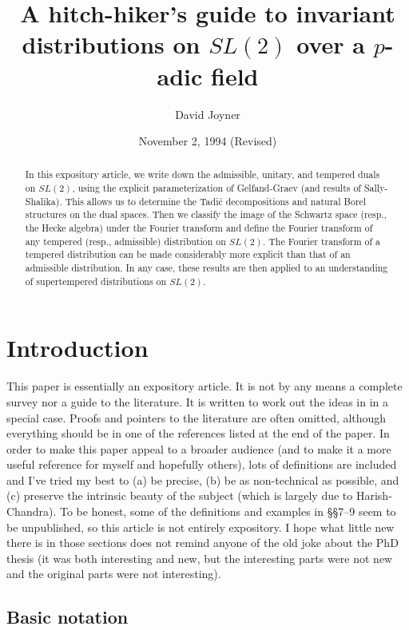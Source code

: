 \documentclass[11pt, a4paper]{article}
\title{A hitch-hiker's guide to invariant distributions on $SL(2)$ over a $p$-adic field}
\author{David Joyner}
\date{November 2, 1994 (Revised)}
\begin{document}
\maketitle

\begin{abstract}
In this expository article, we write down the admissible, unitary, and
tempered duals on $SL(2)$, using the explicit parameterization of
Gelfand-Graev (and results of Sally-Shalika). This allows us to determine
the Tadi\'c decompositions and natural Borel structures on the dual spaces.
Then we classify the image of the Schwartz space (resp., the Hecke algebra)
under the Fourier transform and define the Fourier transform of any tempered
(resp., admissible) distribution on $SL(2)$. The Fourier transform of a
tempered distribution can be made considerably more explicit than that of an
admissible distribution. In any case, these results are then applied to an
understanding of supertempered distributions on $SL(2)$.
\end{abstract}

\tableofcontents


\section{Introduction}

This paper is essentially an expository article. It is not by any means a
complete survey nor a guide to the literature. It is written to work out the
ideas in \cite{J} in a special case. Proofs and pointers to the literature are
often omitted, although everything should be in one of the references listed
at the end of the paper. In order to make this paper appeal to a broader
audience (and to make it a more useful reference for myself and hopefully
others), lots of definitions are included and I've tried my best to (a) be
precise, (b) be as non-technical as possible, and (c) preserve the intrinsic
beauty of the subject (which is largely due to Harish-Chandra). To be
honest, some of the definitions and examples in \S\S 7--9 seem to be
unpublished, so this article is not entirely expository. I hope what little
new there is in those sections does not remind anyone of the old joke about
the PhD thesis (it was both interesting and new, but the interesting parts
were not new and the original parts were not interesting).

\subsection{Basic notation}
\end{document}
